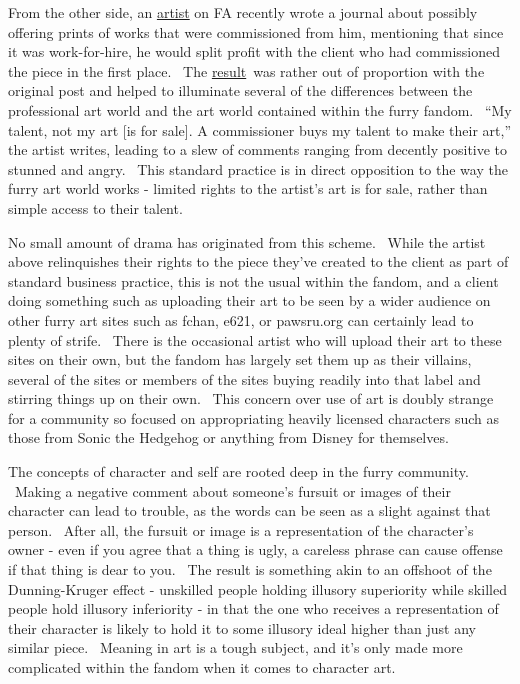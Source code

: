 From the other side, an
\href{http://www.furaffinity.net/user/pseudomanitou}{artist} on FA
recently wrote a journal about possibly offering prints of works that
were commissioned from him, mentioning that since it was work-for-hire,
he would split profit with the client who had commissioned the piece in
the first place. ~The
\href{http://www.furaffinity.net/journal/2840110/}{result}~was rather
out of proportion with the original post and helped to illuminate
several of the differences between the professional art world and the
art world contained within the furry fandom. ~``My talent, not my art
{[}is for sale{]}. A commissioner buys my talent to make their art,''
the artist writes, leading to a slew of comments ranging from decently
positive to stunned and angry. ~This standard practice is in direct
opposition to the way the furry art world works - limited rights to the
artist's art is for sale, rather than simple access to their talent.

No small amount of drama has originated from this scheme. ~While the
artist above relinquishes their rights to the piece they've created to
the client as part of standard business practice, this is not the usual
within the fandom, and a client doing something such as uploading their
art to be seen by a wider audience on other furry art sites such as
fchan, e621, or pawsru.org can certainly lead to plenty of strife.
~There is the occasional artist who will upload their art to these sites
on their own, but the fandom has largely set them up as their villains,
several of the sites or members of the sites buying readily into that
label and stirring things up on their own. ~This concern over use of art
is doubly strange for a community so focused on appropriating heavily
licensed characters such as those from Sonic the Hedgehog or anything
from Disney for themselves.

The concepts of character and self are rooted deep in the furry
community. ~Making a negative comment about someone's fursuit or images
of their character can lead to trouble, as the words can be seen as a
slight against that person. ~After all, the fursuit or image is a
representation of the character's owner - even if you agree that a thing
is ugly, a careless phrase can cause offense if that thing is dear to
you. ~The result is something akin to an offshoot of the Dunning-Kruger
effect - unskilled people holding illusory superiority while skilled
people hold illusory inferiority - in that the one who receives a
representation of their character is likely to hold it to some illusory
ideal higher than just any similar piece. ~Meaning in art is a tough
subject, and it's only made more complicated within the fandom when it
comes to character art.

